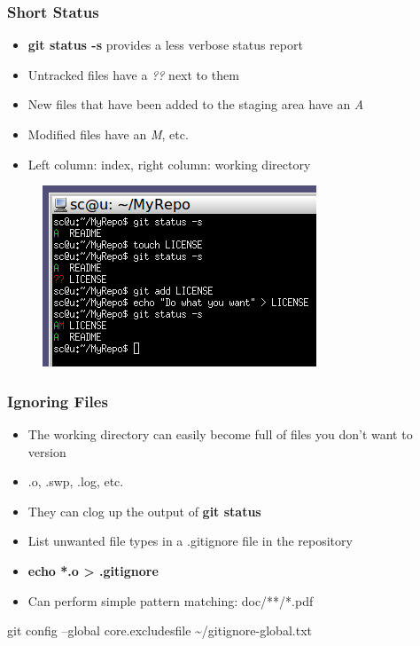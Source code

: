 \documentclass{beamer}
\begin{document}
\begin{frame}
	\frametitle{Short Status}
	\begin{itemize}
		\item{\textbf{git status -s} provides a less verbose status report}
		\item{Untracked files have a \textit{??} next to them}
		\item{New files that have been added to the staging area have an \textit{A}}
		\item{Modified files have an \textit{M}, etc.}
		\item{Left column: index, right column: working directory}
	\end{itemize}
	\begin{figure}
		\includegraphics[scale=0.63]{Short_Status-0.png}
	\end{figure}
\end{frame}

\begin{frame}
	\frametitle{Ignoring Files}
	\begin{itemize}
		\item{The working directory can easily become full of files you don't want to version}
		\item{.o, .swp, .log, etc.}
		\item{They can clog up the output of \textbf{git status}}
		\item{List unwanted file types in a .gitignore file in the repository}
		\item{\textbf{echo *.o \textgreater{} .gitignore}}
		\item{Can perform simple pattern matching: doc/**/*.pdf}
	\end{itemize}

	\begin{tcolorbox}[colback=green!5,colframe=green!40!black,title=Pro Tip]git config --global core.excludesfile \textasciitilde/gitignore-global.txt
	\end{tcolorbox}
\end{frame}
\end{document}
